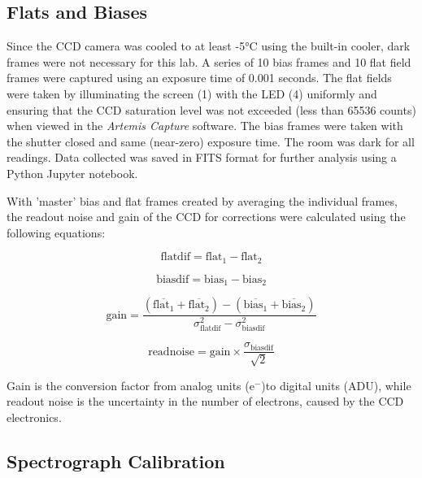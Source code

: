 \documentclass[11pt, a4paper, twocolumn]{article}
\begin{document}
\subsection{Flats and Biases}

Since the CCD camera was cooled to at least -5°C using the built-in cooler, dark frames were not necessary for this lab. A series of 10 bias frames and
10 flat field frames were captured using an exposure time of 0.001 seconds. The flat fields were taken by illuminating the screen (1) with the LED (4) 
uniformly and ensuring that the CCD saturation level was not exceeded (less than 65536 counts) when viewed in the \textit{Artemis Capture} software. The
bias frames were taken with the shutter closed and same (near-zero) exposure time. The room was dark for all readings. Data collected was saved in FITS 
format for further analysis using a Python Jupyter notebook.

With 'master' bias and flat frames created by averaging the individual frames, the readout noise and gain of the CCD for corrections were calculated
using the following equations:

\begin{equation} \label{eq:1}
  \text{flatdif} = \text{flat}_1 - \text{flat}_2
\end{equation}

\begin{equation} \label{eq:2}
  \text{biasdif} = \text{bias}_1 - \text{bias}_2
\end{equation}

\begin{equation} \label{eq:3}
  \text{gain} = \frac{\left( \overline{\text{flat}_1} + \overline{\text{flat}_2} \right) - \left( \overline{\text{bias}_1} + \overline{\text{bias}_2} \right)}{\sigma^2_{\text{flatdif}} - \sigma^2_{\text{biasdif}}}
\end{equation}

\begin{equation} \label{eq:4}
  \text{readnoise} = \text{gain} \times \frac{\sigma_{\text{biasdif}}}{\sqrt{2}}
\end{equation}

Gain is the conversion factor from analog units (e$^-$)to digital units (ADU), while readout noise is the uncertainty in the number of electrons, caused
by the CCD electronics.

\subsection{Spectrograph Calibration}
\end{document}
